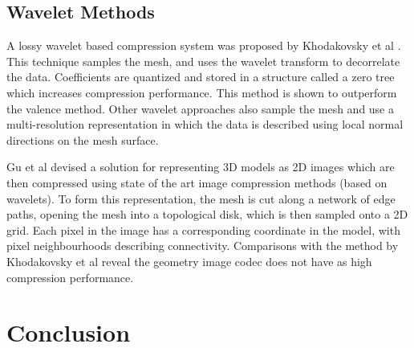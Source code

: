 \subsection{Wavelet Methods}

A lossy wavelet based compression system was proposed by Khodakovsky et al \cite{Khodakovsky00Progressive}. This technique samples the mesh, and uses the wavelet transform to decorrelate the data. Coefficients are quantized and stored in a structure called a zero tree which increases compression performance. This method is shown to outperform the valence method. Other wavelet approaches \cite{Guskov00Normal,Khodakovsky04Normalmesh} also sample the mesh and use a multi-resolution representation in which the data is described using local normal directions on the mesh surface.

Gu et al \cite{Gu02Geometry} devised a solution for representing 3D models as 2D images which are then compressed using state of the art image compression methods (based on wavelets). To form this representation, the mesh is cut along a network of edge paths, opening the mesh into a topological disk, which is then sampled onto a 2D grid. Each pixel in the image has a corresponding coordinate in the model, with pixel neighbourhoods describing connectivity. Comparisons with the method by Khodakovsky et al reveal the geometry image codec does not have as high compression performance.






\section{Conclusion}

